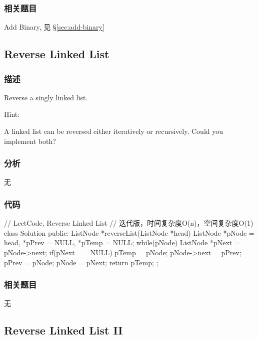 \subsubsection{相关题目}

\begindot
\item Add Binary, 见 \S \ref{sec:add-binary}
\myenddot


\subsection{Reverse Linked List}
\label{sec:reverse-linked-list}


\subsubsection{描述}
Reverse a singly linked list.

Hint:

A linked list can be reversed either iteratively or recursively. Could you implement both?


\subsubsection{分析}
无


\subsubsection{代码}
\begin{Code}
// LeetCode, Reverse Linked List
// 迭代版，时间复杂度O(n)，空间复杂度O(1)
class Solution {
    public:
    ListNode *reverseList(ListNode *head) {
        ListNode *pNode = head, *pPrev = NULL, *pTemp = NULL;
        while(pNode)
        {
            ListNode *pNext = pNode->next;
            if(pNext == NULL)
            {
                pTemp = pNode;
            }    
            pNode->next = pPrev;
            pPrev = pNode;
            pNode = pNext;
        }
        return pTemp;
    }
};
\end{Code}


\subsubsection{相关题目}

\begindot
\item 无
\myenddot


\subsection{Reverse Linked List II}
\label{sec:reverse-linked-list-ii}


